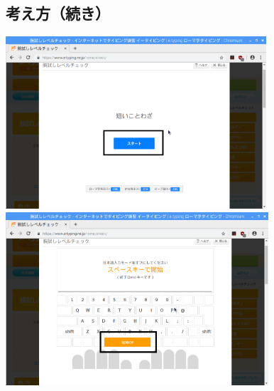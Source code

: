 \documentclass[a4paper,12pt]{jarticle}
\begin{document}
\clearpage
\begin{figure}[t]
  \subsection{ 考え方（続き）}

  \centering
  \includegraphics[width=9.719cm,height=6.396cm]{textbook-img091.png}

  \bigskip
  \includegraphics[width=9.786cm,height=6.442cm]{textbook-img090.png}

  \bigskip


  \bigskip


\end{figure}
\end{document}

